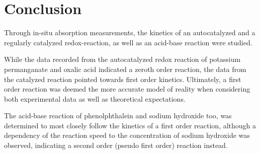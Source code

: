 \documentclass[titlepage]{article}
\begin{document}
\section{Conclusion}
Through in-situ absorption measurements, the kinetics of an autocatalyzed and a regularly catalyzed redox-reaction, as well as an acid-base reaction were studied.

While the data recorded from the autocatalyzed redox reaction of potassium permanganate and oxalic acid indicated a zeroth order reaction, the data from the catalyzed reaction pointed towards first order kinetics. Ultimately, a first order reaction was deemed the more accurate model of reality when considering both experimental data as well as theoretical expectations.

The acid-base reaction of phenolphthalein and sodium hydroxide too, was determined to most closely follow the kinetics of a first order reaction, although a dependency of the reaction speed to the concentration of sodium hydroxide was observed, indicating a second order (pseudo first order) reaction instead.

\appendix
\appendixpage
\end{document}
